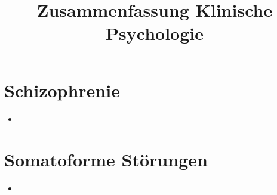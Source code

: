 \documentclass[11pt, paper=a4, twocolumn]{scrartcl}
\title{\vspace{-1.25cm}Zusammenfassung Klinische Psychologie\vspace{-0.25cm}}
\date{\vspace{-5ex}}
\begin{document}
	\maketitle


	\section{Schizophrenie}
		\begin{itemize}
			\item 
		\end{itemize}

	\section{Somatoforme Störungen}
		\begin{itemize}
			\item 
		\end{itemize}
\end{document}
